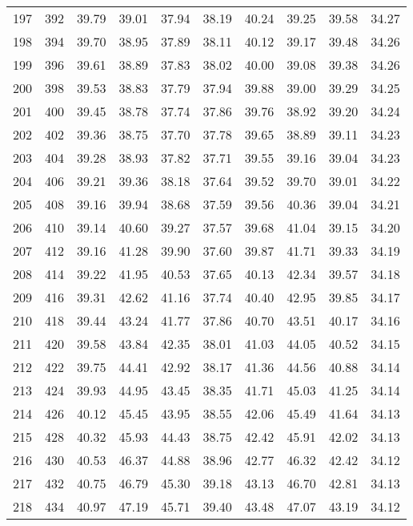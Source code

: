 \begin{longtable}{rrllllllll}
		197 & 392 & 39.79 & 39.01 & 37.94 & 38.19 & 40.24 & 39.25 & 39.58 & 34.27 \\ 
		198 & 394 & 39.70 & 38.95 & 37.89 & 38.11 & 40.12 & 39.17 & 39.48 & 34.26 \\ 
		199 & 396 & 39.61 & 38.89 & 37.83 & 38.02 & 40.00 & 39.08 & 39.38 & 34.26 \\ 
		200 & 398 & 39.53 & 38.83 & 37.79 & 37.94 & 39.88 & 39.00 & 39.29 & 34.25 \\ 
		201 & 400 & 39.45 & 38.78 & 37.74 & 37.86 & 39.76 & 38.92 & 39.20 & 34.24 \\ 
		202 & 402 & 39.36 & 38.75 & 37.70 & 37.78 & 39.65 & 38.89 & 39.11 & 34.23 \\ 
		203 & 404 & 39.28 & 38.93 & 37.82 & 37.71 & 39.55 & 39.16 & 39.04 & 34.23 \\ 
		204 & 406 & 39.21 & 39.36 & 38.18 & 37.64 & 39.52 & 39.70 & 39.01 & 34.22 \\ 
		205 & 408 & 39.16 & 39.94 & 38.68 & 37.59 & 39.56 & 40.36 & 39.04 & 34.21 \\ 
		206 & 410 & 39.14 & 40.60 & 39.27 & 37.57 & 39.68 & 41.04 & 39.15 & 34.20 \\ 
		207 & 412 & 39.16 & 41.28 & 39.90 & 37.60 & 39.87 & 41.71 & 39.33 & 34.19 \\ 
		208 & 414 & 39.22 & 41.95 & 40.53 & 37.65 & 40.13 & 42.34 & 39.57 & 34.18 \\ 
		209 & 416 & 39.31 & 42.62 & 41.16 & 37.74 & 40.40 & 42.95 & 39.85 & 34.17 \\ 
		210 & 418 & 39.44 & 43.24 & 41.77 & 37.86 & 40.70 & 43.51 & 40.17 & 34.16 \\ 
		211 & 420 & 39.58 & 43.84 & 42.35 & 38.01 & 41.03 & 44.05 & 40.52 & 34.15 \\ 
		212 & 422 & 39.75 & 44.41 & 42.92 & 38.17 & 41.36 & 44.56 & 40.88 & 34.14 \\ 
		213 & 424 & 39.93 & 44.95 & 43.45 & 38.35 & 41.71 & 45.03 & 41.25 & 34.14 \\ 
		214 & 426 & 40.12 & 45.45 & 43.95 & 38.55 & 42.06 & 45.49 & 41.64 & 34.13 \\ 
		215 & 428 & 40.32 & 45.93 & 44.43 & 38.75 & 42.42 & 45.91 & 42.02 & 34.13 \\ 
		216 & 430 & 40.53 & 46.37 & 44.88 & 38.96 & 42.77 & 46.32 & 42.42 & 34.12 \\ 
		217 & 432 & 40.75 & 46.79 & 45.30 & 39.18 & 43.13 & 46.70 & 42.81 & 34.13 \\ 
		218 & 434 & 40.97 & 47.19 & 45.71 & 39.40 & 43.48 & 47.07 & 43.19 & 34.12 \\ 

\end{longtable}
